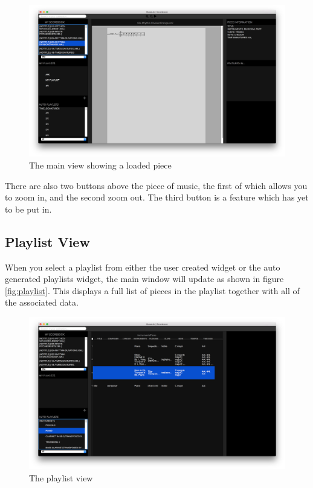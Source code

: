 \begin{figure}[H]
\centering
\includegraphics[width=500]{main_piece}
\caption{The main view showing a loaded piece}
\label{fig:piece}	
\end{figure}

There are also two buttons above the piece of music, the first of which allows you to zoom in, and the second zoom out. The third button is a feature which has yet to be put in.
\subsection{Playlist View}
When you select a playlist from either the user created widget or the auto generated playlists widget, the main window will update as shown in figure \ref{fig:playlist}. This displays a full list of pieces in the playlist together with all of the associated data.
\begin{figure}[H]
\centering
\includegraphics[width=500pt]{main_playlist}
\caption{The playlist view}
\label{fig:piece}	
\end{figure}

